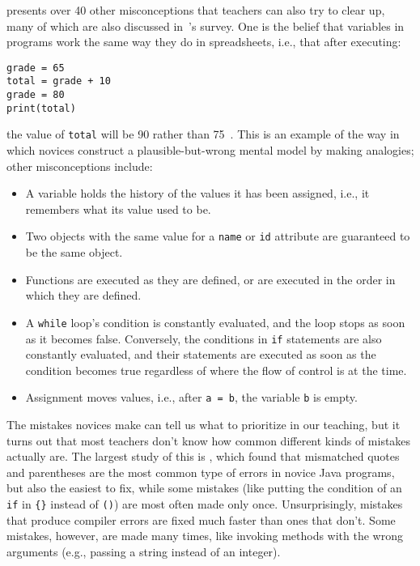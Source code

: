 \cite{Sorv2018} presents over 40 other misconceptions that teachers can also try to clear up,
many of which are also discussed in~\cite{Qian2017}'s survey.
One is the belief that variables in programs work the same way they do in spreadsheets,
i.e.,
that after executing:

\begin{verbatim}
grade = 65
total = grade + 10
grade = 80
print(total)
\end{verbatim}

\noindent
the value of \texttt{total} will be 90 rather than 75~\cite{Kohn2017}.
This is an example of the way in which novices construct a plausible-but-wrong mental model by making analogies;
other misconceptions include:

\begin{itemize}

\item
  A variable holds the history of the values it has been assigned,
  i.e., it remembers what its value used to be.

\item
  Two objects with the same value for a \texttt{name} or \texttt{id} attribute
  are guaranteed to be the same object.

\item
  Functions are executed as they are defined,
  or are executed in the order in which they are defined.

\item
  A \texttt{while} loop's condition is constantly evaluated,
  and the loop stops as soon as it becomes false.
  Conversely,
  the conditions in \texttt{if} statements are also constantly evaluated,
  and their statements are executed as soon as the condition becomes true
  regardless of where the flow of control is at the time.

\item
  Assignment moves values,
  i.e.,
  after \texttt{a\ =\ b}, the variable \texttt{b} is empty.

\end{itemize}


The mistakes novices make can tell us what to prioritize in our teaching,
but it turns out that most teachers don't know how common different kinds of mistakes actually are.
The largest study of this is \cite{Brow2017},
which found that mismatched quotes and parentheses are the most common type of errors in novice Java programs,
but also the easiest to fix,
while some mistakes (like putting the condition of an \texttt{if} in \texttt{\{\}} instead of \texttt{()})
are most often made only once.
Unsurprisingly,
mistakes that produce compiler errors are fixed much faster than ones that don't.
Some mistakes,
however,
are made many times,
like invoking methods with the wrong arguments
(e.g., passing a string instead of an integer).

